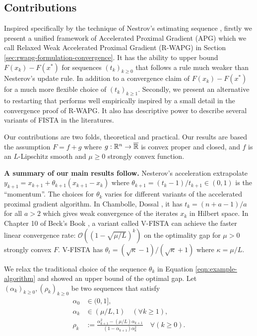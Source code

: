 \documentclass[12pt]{article}
\begin{document}
    \subsection{Contributions}
        Inspired specifically by the technique of Nestrov's estimating sequence \cite{nesterov_lectures_2018}, firstly we present a unified framework of Accelerated Proximal Gradient (APG) which we call Relaxed Weak Accelerated Proximal Gradient (R-WAPG) in Section \ref{sec:rwapg-formulation-convergence}.
        It has the ability to upper bound $F(x_k) - F(x^*)$ for sequences $(t_k)_{k \ge 0}$ that follows a rule much weaker than Nesterov's update rule. 
        In addition to a convergence claim of $F(x_k)- F(x^*)$ for a much more flexible choice of $(t_k)_{k \ge 1}$. 
        Secondly, we present an alternative to restarting that performs well empirically inspired by a small detail in the convergence proof of R-WAPG. 
        It also has descriptive power to describe several variants of FISTA in the literatures.  
        \par
        Our contributions are two folds, theoretical and practical. 
        Our results are based the assumption $F = f + g$ where $g:\mathbb R^n \rightarrow \overline{\mathbb R}$ is convex proper and closed, and $f$ is an $L$-Lipschitz smooth and $\mu \ge 0$ strongly convex function. 
        \par
        \textbf{A summary of our main results follow. } 
        Nesterov's acceleration extrapolate $y_{k + 1} = x_{k + 1} + \theta_{k + 1}(x_{k + 1} - x_k)$ where $\theta_{k + 1} = (t_{k} - 1)/t_{k + 1} \in (0, 1)$ is the ``momentum''. 
        The choices for $\theta_k$ varies for different variants of the accelerated proximal gradient algorithm. 
        In Chambolle, Dossal \cite{chambolle_convergence_2015}, it has $t_k = (n + a - 1)/a$ for all $a > 2$ which gives weak convergence of the iterates $x_k$ in Hilbert space. 
        In Chapter 10 of Beck's Book \cite{beck_first-order_2017}, a variant called V-FISTA can achieve the faster linear convergence rate: $\mathcal O((1 - \sqrt{\mu/L})^k)$ on the optimality gap for $\mu > 0$ strongly convex $F$. 
        V-FISTA has $\theta_t = (\sqrt{\kappa} - 1)/(\sqrt{\kappa} + 1)$ where $\kappa = \mu/L$. 
        \par
        We relax the traditional choice of the sequence $\theta_k$ in Equation \ref{eqn:example-algorithm} and showed an upper bound of the optimal gap. 
        Let $(\alpha_k)_{k \ge0}, (\rho_k)_{k \ge 0}$ be two sequences that satisfy
        \begin{align*}
            \alpha_0 &\in (0, 1], 
            \\
            \alpha_k &\in (\mu/L, 1) \quad (\forall k \ge 1), 
            \\
            \rho_k &:= \frac{\alpha_{k + 1}^2 - (\mu/L)\alpha_{k + 1}}{(1 - \alpha_{k + 1})\alpha_k^2} \quad \forall (k \ge 0). 
        \end{align*}
\end{document}

